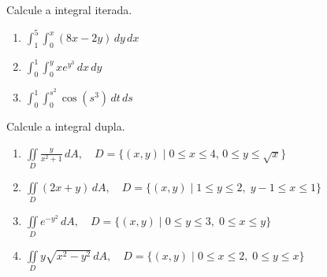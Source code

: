 




	
	\vspace{5mm}
	
	Calcule a integral iterada.
	
	\begin{enumerate}
		
		\item $\displaystyle \int_{1}^{5} \int_{0}^{x} (8x - 2y) \, dy \, dx$ 
		
		\item $\displaystyle \int_{0}^{1} \int_{0}^{y} xe^{y^{3}} \, dx \, dy$ 
		
		\item $\displaystyle \int_{0}^{1} \int_{0}^{s^{2}} \cos(s^{3}) \, dt \, ds$ 
		
		
	\end{enumerate}
	
	\vspace{5mm}
	
	Calcule a integral dupla.
	
	\begin{enumerate}[resume]
	
		\item $\displaystyle \iint \limits_{D} \frac{y}{x^2 + 1} \, dA, \quad D = \{ (x, y) \; | \; 0 \leq x \leq 4, \, 0 \leq y \leq \sqrt{x} \}$
		
		\item $\displaystyle \iint \limits_{D} (2x + y) \, dA, \quad D = \{ (x, y) \; | \; 1 \leq y \leq 2, \; y-1 \leq x \leq 1 \}$
		
		\item $\displaystyle \iint \limits_{D} e^{-y^2} \, dA, \quad D = \{ (x, y) \; | \; 0 \leq y \leq 3, \; 0 \leq x \leq y \}$
		
		\item $\displaystyle \iint \limits_{D} y \sqrt{x^2 - y^2} \, dA, \quad D = \{ (x, y) \; | \; 0 \leq x \leq 2, \; 0 \leq y \leq x \}$

	\end{enumerate}
	
